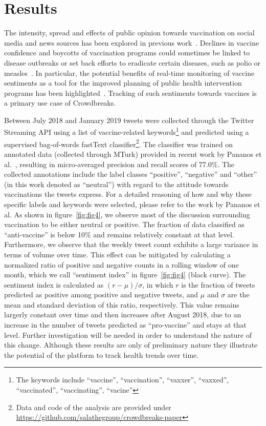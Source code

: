 \documentclass[a4paper, 11pt]{article}
\begin{document}
\section{Results}
The intensity, spread and effects of public opinion towards vaccination on social media and news sources has been explored in previous work~\cite{seeman2010assessing,Salathe2011a}.
Declines in vaccine confidence and boycotts of vaccination programs could sometimes be linked to disease outbreaks or set back efforts to eradicate certain diseases, such as polio or measles~\cite{larson2011lessons,yahya2007polio}.
In particular, the potential benefits of real-time monitoring of vaccine sentiments as a tool for the improved planning of public health intervention programs has been highlighted~\cite{Larson2013,Pananos2017,Bahk2016}.
Tracking of such sentiments towards vaccines is a primary use case of Crowdbreaks.\par
Between July 2018 and January 2019 tweets were collected through the Twitter Streaming API using a list of vaccine-related keywords\footnote{The keywords include ``vaccine'', ``vaccination'', ``vaxxer'', ``vaxxed'', ``vaccinated'', ``vaccinating'', ``vacine''} and predicted using a supervised bag-of-words fastText classifier\footnote{Data and code of the analysis are provided under \url{https://github.com/salathegroup/crowdbreaks-paper}}.
The classifier was trained on annotated data (collected through MTurk) provided in recent work by Pananos et al.~\cite{Pananos2017}, resulting in micro-averaged precision and recall scores of 77.0\%.
The collected annotations include the label classes ``positive'', ``negative'' and ``other'' (in this work denoted as ``neutral'') with regard to the attitude towards vaccinations the tweets express.
For a detailed reasoning of how and why these specific labels and keywords were selected, please refer to the work by Pananos et al.
As shown in figure~\ref{fig:fig4}, we observe most of the discussion surrounding vaccination to be either neutral or positive.
The fraction of data classified as ``anti-vaccine'' is below 10\% and remains relatively constant at that level.
Furthermore, we observe that the weekly tweet count exhibits a large variance in terms of volume over time.
This effect can be mitigated by calculating a normalized ratio of positive and negative counts in a rolling window of one month, which we call ``sentiment index'' in figure~\ref{fig:fig4} (black curve).
The sentiment index is calculated as $(r-\mu)/\sigma$, in which $r$ is the fraction of tweets predicted as positive among positive and negative tweets, and $\mu$ and $\sigma$ are the mean and standard deviation of this ratio, respectively.
This value remains largerly constant over time and then increases after August 2018, due to an increase in the number of tweets predicted as ``pro-vaccine'' and stays at that level.
Further investigation will be needed in order to understand the nature of this change.
Although these results are only of preliminary nature they illustrate the potential of the platform to track health trends over time.
\end{document}
